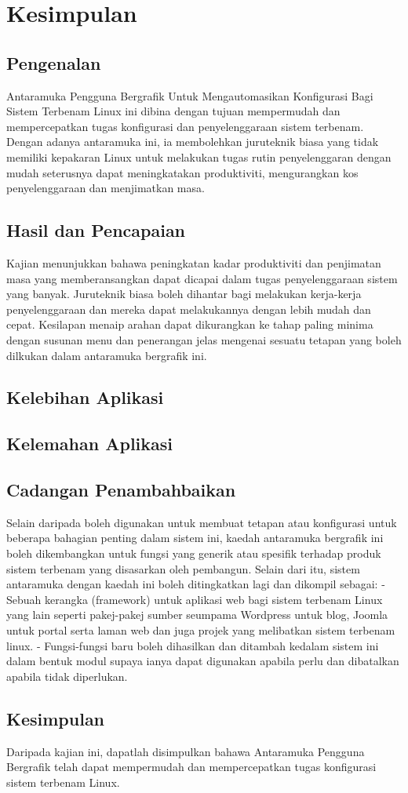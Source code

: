 \chapter{Kesimpulan}\label{c7}
\section{Pengenalan}
Antaramuka Pengguna Bergrafik Untuk Mengautomasikan Konfigurasi Bagi Sistem Terbenam Linux ini dibina dengan tujuan mempermudah dan mempercepatkan tugas konfigurasi dan penyelenggaraan sistem terbenam. Dengan adanya antaramuka ini, ia membolehkan juruteknik biasa yang tidak memiliki kepakaran Linux untuk melakukan tugas rutin penyelenggaran dengan mudah seterusnya dapat meningkatakan produktiviti, mengurangkan kos penyelenggaraan dan menjimatkan masa.

\section{Hasil dan Pencapaian}
Kajian menunjukkan bahawa peningkatan kadar produktiviti dan penjimatan masa yang memberansangkan dapat dicapai dalam tugas penyelenggaraan sistem yang banyak. Juruteknik biasa boleh dihantar bagi melakukan kerja-kerja penyelenggaraan dan mereka dapat melakukannya dengan lebih mudah dan cepat. Kesilapan menaip arahan dapat dikurangkan ke tahap paling minima dengan susunan menu dan penerangan jelas mengenai sesuatu tetapan yang boleh dilkukan dalam antaramuka bergrafik ini.

\section{Kelebihan Aplikasi}


\section{Kelemahan Aplikasi}


\section{Cadangan Penambahbaikan}
Selain daripada boleh digunakan untuk membuat tetapan atau konfigurasi untuk beberapa bahagian penting dalam sistem ini, kaedah antaramuka bergrafik ini boleh dikembangkan untuk fungsi yang generik atau spesifik terhadap produk sistem terbenam yang disasarkan oleh pembangun. Selain dari itu, sistem antaramuka dengan kaedah ini boleh ditingkatkan lagi dan dikompil sebagai:
- Sebuah kerangka (framework) untuk aplikasi web bagi sistem terbenam Linux yang lain seperti pakej-pakej sumber seumpama Wordpress untuk blog, Joomla untuk portal serta laman web dan juga projek yang melibatkan sistem terbenam linux.
- Fungsi-fungsi baru boleh dihasilkan dan ditambah kedalam sistem ini dalam bentuk modul supaya ianya dapat digunakan apabila perlu dan dibatalkan apabila tidak diperlukan.

\section{Kesimpulan}
Daripada kajian ini, dapatlah disimpulkan bahawa Antaramuka Pengguna Bergrafik telah dapat mempermudah dan mempercepatkan tugas konfigurasi sistem terbenam Linux. 
